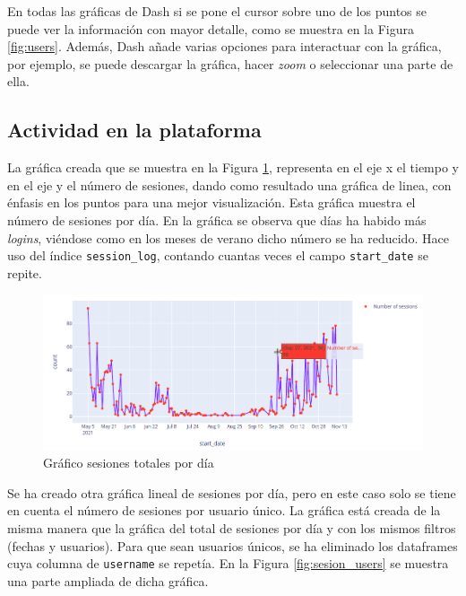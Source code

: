 En todas las gráficas de Dash si se pone el cursor sobre uno de los puntos se puede ver la información con mayor detalle, como se muestra en la Figura \ref{fig:users}. Además, Dash añade varias opciones para interactuar con la gráfica, por ejemplo, se puede descargar la gráfica, hacer \textit{zoom} o seleccionar una parte de ella. \\
\subsection{Actividad en la plataforma}

La gráfica creada que se muestra en la Figura \ref{fig:sesion}, representa en el eje x el tiempo y en el eje y el número de sesiones, dando como resultado una gráfica de linea, con énfasis en los puntos para una mejor visualización. Esta gráfica muestra el número de sesiones por día. En la gráfica se observa que días ha habido más \textit{logins}, viéndose como en los meses de verano dicho número se ha reducido. Hace uso del índice \texttt{session\_log}, contando cuantas veces el campo \texttt{start\_date} se repite.\\



\begin{figure}[H]
    \centering
    \includegraphics[width=16cm, keepaspectratio]{img/sesion.png}
    \caption{Gráfico sesiones totales por día}
    \label{fig:sesion}
\end{figure}
Se ha creado otra gráfica lineal de sesiones por día, pero en este caso solo se tiene en cuenta el número de sesiones por usuario único. La gráfica está creada de la misma manera que la gráfica del total de sesiones por día y con los mismos filtros (fechas y usuarios). Para que sean usuarios únicos, se ha eliminado los dataframes cuya columna de \texttt{username} se repetía. En la Figura \ref{fig:sesion_users}  se muestra una parte ampliada de dicha gráfica.\\

